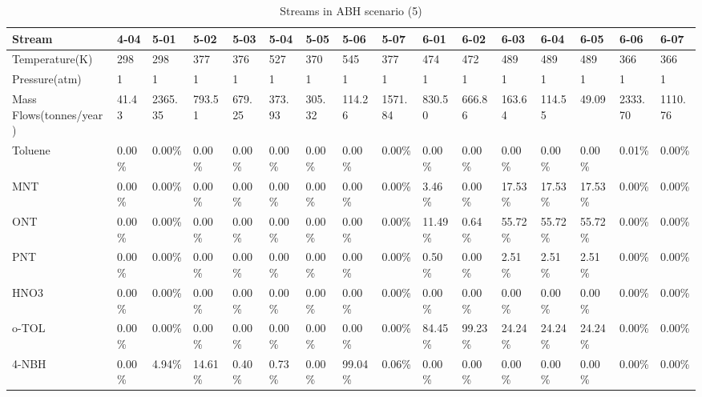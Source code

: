 \begin{landscape}
\begin{table}[H]
\centering
\caption{Streams in ABH scenario (5)}
\label{ABHFST5}
\begin{tabular}{|l|l|l|l|l|l|l|l|l|l|l|l|l|l|l|l|}
\hline
\textbf{Stream}         & 4-04    & 5-01    & 5-02    & 5-03    & 5-04    & 5-05    & 5-06    & 5-07    & 6-01    & 6-02    & 6-03    & 6-04    & 6-05    & 6-06    & 6-07    \\ \hline
Temperature(K)          & 298     & 298     & 377     & 376     & 527     & 370     & 545     & 377     & 474     & 472     & 489     & 489     & 489     & 366     & 366     \\ \hline
Pressure(atm)           & 1       & 1       & 1       & 1       & 1       & 1       & 1       & 1       & 1       & 1       & 1       & 1       & 1       & 1       & 1       \\ \hline
Mass Flows(tonnes/year) & 41.43   & 2365.35 & 793.51  & 679.25  & 373.93  & 305.32  & 114.26  & 1571.84 & 830.50  & 666.86  & 163.64  & 114.55  & 49.09   & 2333.70 & 1110.76 \\ \hline
Toluene                 & 0.00\%  & 0.00\%  & 0.00\%  & 0.00\%  & 0.00\%  & 0.00\%  & 0.00\%  & 0.00\%  & 0.00\%  & 0.00\%  & 0.00\%  & 0.00\%  & 0.00\%  & 0.01\%  & 0.00\%  \\ \hline
MNT                     & 0.00\%  & 0.00\%  & 0.00\%  & 0.00\%  & 0.00\%  & 0.00\%  & 0.00\%  & 0.00\%  & 3.46\%  & 0.00\%  & 17.53\% & 17.53\% & 17.53\% & 0.00\%  & 0.00\%  \\ \hline
ONT                     & 0.00\%  & 0.00\%  & 0.00\%  & 0.00\%  & 0.00\%  & 0.00\%  & 0.00\%  & 0.00\%  & 11.49\% & 0.64\%  & 55.72\% & 55.72\% & 55.72\% & 0.00\%  & 0.00\%  \\ \hline
PNT                     & 0.00\%  & 0.00\%  & 0.00\%  & 0.00\%  & 0.00\%  & 0.00\%  & 0.00\%  & 0.00\%  & 0.50\%  & 0.00\%  & 2.51\%  & 2.51\%  & 2.51\%  & 0.00\%  & 0.00\%  \\ \hline
HNO3                    & 0.00\%  & 0.00\%  & 0.00\%  & 0.00\%  & 0.00\%  & 0.00\%  & 0.00\%  & 0.00\%  & 0.00\%  & 0.00\%  & 0.00\%  & 0.00\%  & 0.00\%  & 0.00\%  & 0.00\%  \\ \hline
o-TOL                   & 0.00\%  & 0.00\%  & 0.00\%  & 0.00\%  & 0.00\%  & 0.00\%  & 0.00\%  & 0.00\%  & 84.45\% & 99.23\% & 24.24\% & 24.24\% & 24.24\% & 0.00\%  & 0.00\%  \\ \hline
4-NBH                   & 0.00\%  & 4.94\%  & 14.61\% & 0.40\%  & 0.73\%  & 0.00\%  & 99.04\% & 0.06\%  & 0.00\%  & 0.00\%  & 0.00\%  & 0.00\%  & 0.00\%  & 0.00\%  & 0.00\%  \\ \hline

\end{tabular}
\end{table}
\end{landscape}

